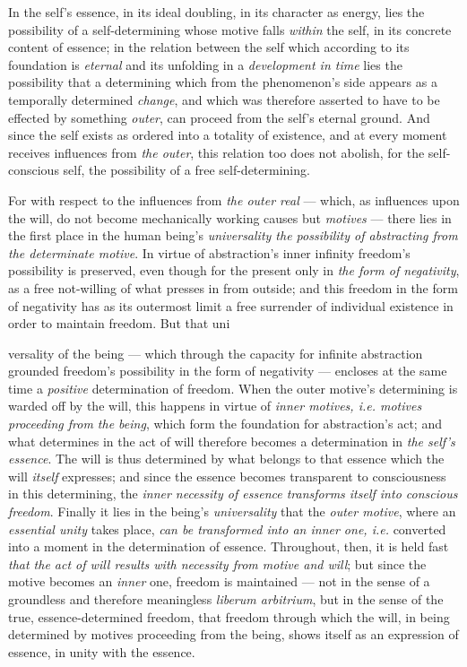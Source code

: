 \documentclass[12pt,a4paper]{book}
\begin{document}
In the self's essence, in its ideal doubling, in its character as energy, lies
the possibility of a self-determining whose motive falls \emph{within} the
self, in its concrete content of essence; in the relation between the self
which according to its foundation is \emph{eternal} and its unfolding in a
\emph{development in time} lies the possibility that a determining which from
the phenomenon's side appears as a temporally determined \emph{change}, and
which was therefore asserted to have to be effected by something \emph{outer},
can proceed from the self's eternal ground. And since the self exists as
ordered into a totality of existence, and at every moment receives influences
from \emph{the outer}, this relation too does not abolish, for the
self-conscious self, the possibility of a free self-determining.

For with respect to the influences from \emph{the outer real} --- which, as
influences upon the will, do not become mechanically working causes but
\emph{motives} --- there lies in the first place in the human being's
\emph{universality the possibility of abstracting from the determinate motive}.
In virtue of abstraction's inner infinity freedom's possibility is preserved,
even though for the present only in \emph{the form of negativity}, as a free
not-willing of what presses in from outside; and this freedom in the form of
negativity has as its outermost limit a free surrender of individual existence
in order to maintain freedom. But that uni\-%

\setcounter{footnote}{0}%
versality of the being --- which through the capacity for infinite abstraction
grounded freedom's possibility in the form of negativity --- encloses at the
same time a \emph{positive} determination of freedom. When the outer motive's
determining is warded off by the will, this happens in virtue of \emph{inner
motives, i.e. motives proceeding from the being}, which form the foundation for
abstraction's act; and what determines in the act of will therefore becomes a
determination in \emph{the self's essence}. The will is thus determined by what
belongs to that essence which the will \emph{itself} expresses; and since the
essence becomes transparent to consciousness in this determining, the
\emph{inner necessity of essence transforms itself into conscious freedom}.
Finally it lies in the being's \emph{universality} that the \emph{outer motive},
where an \emph{essential unity} takes place, \emph{can be transformed into an
inner one, i.e.} converted into a moment in the determination of essence.
Throughout, then, it is held fast \emph{that the act of will results with
necessity from motive and will}; but since the motive becomes an \emph{inner}
one, freedom is maintained --- not in the sense of a groundless and therefore
meaningless \textit{liberum arbitrium}, but in the sense of the true,
essence-determined freedom, that freedom through which the will, in being
determined by motives proceeding from the being, shows itself as an expression
of essence, in unity with the essence.
\end{document}
